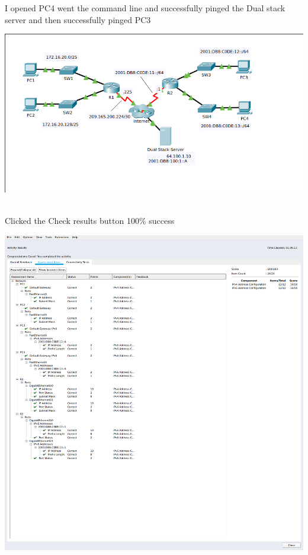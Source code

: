 \documentclass[../EngineeringJournal_CDavis.tex]{subfiles}
\begin{document}
I opened PC4 went the command line and successfully pinged the Dual stack server and then successfully pinged PC3
\begin{center}
	\includegraphics[scale=0.4]{Figures/2020-01-23-142952_808x429_scrot.png}
\end{center}

\newpage


\\
Clicked the Check results button 100\% success
\begin{center}
	\includegraphics[scale=0.30]{Figures/2020-01-23-143037_1304x1378_scrot.png}
\end{center}
\end{document}

